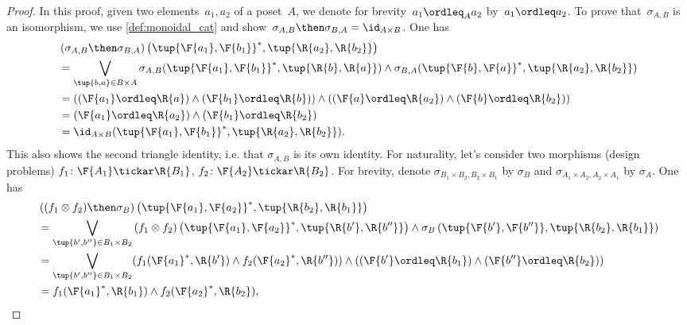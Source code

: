 \begin{proof}
In this proof, given two elements~$a_1,a_2$ of a poset~$A$, we denote for brevity~$a_1 \ordleq_A a_2$ by~$a_1 \ordleq a_2$.
To prove that~$\sigma_{A,B}$ is an isomorphism, we use \cref{def:monoidal_cat} and show~$\sigma_{A,B}\then \sigma_{B,A}=\id_{A\times B}$. One has
    \begin{equation}
        \begin{aligned}
           &\left( \sigma_{A,B}\then \sigma_{B,A}\right) \left( \tup{\F{a_1},\F{b_1}}^*,\tup{\R{a_2},\R{b_2}}\right)\\
           &=\bigvee_{\tup{b,a}\in B\times A}\sigma_{A,B}(\tup{\F{a_1},\F{b_1}}^*,\tup{\R{b},\R{a}})\wedge \sigma_{B,A}(\tup{\F{b},\F{a}}^*,\tup{\R{a_2},\R{b_2}})\\
           &=\left( (\F{a_1}\ordleq \R{a}) \wedge (\F{b_1}\ordleq \R{b})\right)\wedge \left((\F{a}\ordleq \R{a_2}) \wedge (\F{b}\ordleq \R{b_2})\right)\\
           &=(\F{a_1}\ordleq \R{a_2})\wedge (\F{b_1}\ordleq \R{b_2})\\
           &=\id_{A\times B}(\tup{\F{a_1},\F{b_1}}^*,\tup{\R{a_2},\R{b_2}}).
        \end{aligned}
    \end{equation}
    This also shows the second triangle identity, i.e. that $\sigma_{A,B}$ is its own identity.
    For naturality, let's consider two morphisms (design problems) $f_1\colon \F{A_1}\tickar \R{B_1}$, $f_2\colon \F{A_2}\tickar \R{B_2}$. For brevity, denote $\sigma_{B_1\times B_2,B_2\times B_1}$ by $\sigma_B$ and $\sigma_{A_1\times A_2,A_2\times A_1}$ by $\sigma_A$. One has
    \begin{equation}
        \begin{aligned}
           &\left((f_1\otimes f_2)\then \sigma_B \right)\left( \tup{\F{a_1},\F{a_2}}^*,\tup{\R{b_2},\R{b_1}}\right)\\
           &=\bigvee_{\tup{b',b''}\in B_1\times B_2} \left(f_1\otimes f_2\right) \left( \tup{\F{a_1},\F{a_2}}^*,\tup{\R{b'},\R{b''}}\right)\wedge \sigma_B\left(\tup{\F{b'},\F{b''}},\tup{\R{b_2},\R{b_1}} \right)\\
           &=\bigvee_{\tup{b',b''}\in B_1\times B_2}(f_1(\F{a_1}^*,\R{b'})\wedge f_2(\F{a_2}^*,\R{b''}))\wedge (\left(\F{b'}\ordleq \R{b_1}\right) \wedge \left(\F{b''}\ordleq \R{b_2}\right))\\
           &= f_1(\F{a_1}^*,\R{b_1}) \wedge f_2(\F{a_2}^*,\R{b_2}),
        \end{aligned}
    \end{equation}

\end{proof}
